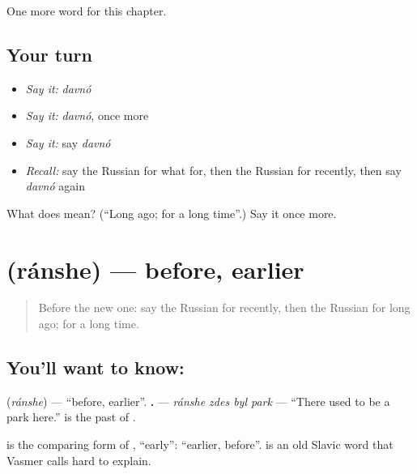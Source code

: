\begin{grammarlens}[title={What you've built}]
One more word for this chapter.
\end{grammarlens}

\subsection*{Your turn}
\begin{itemize}
\raggedright
  \item \emph{Say it:} \emph{davnó}
  \item \emph{Say it:} \emph{davnó}, once more
  \item \emph{Say it:} say \emph{davnó}
  \item \emph{Recall:} say the Russian for what for, then the Russian for recently, then say \emph{davnó} again
\end{itemize}

\begin{tcolorbox}[breakable,colback=teal!4,colframe=teal!35!black,title={Before you move on}]
What does  mean? (\textquotedblleft{}Long ago; for a long time\textquotedblright{}.) Say it once more.
\end{tcolorbox}
\section[\texorpdfstring{\ru{раньше} (ránshe)}{раньше (ránshe)}]{ (ránshe) — before, earlier}

\label{lesson:RU-C137-ranshe}



\begin{quote}
Before the new one: say the Russian for recently, then the Russian for long ago; for a long time.
\end{quote}

\subsection*{You'll want to know: }
\textbf{} (\emph{ránshe}) — \textquotedblleft{}before, earlier\textquotedblright{}. \textbf{   .} — \emph{ránshe zdes byl park} — \textquotedblleft{}There used to be a park here.\textquotedblright{} \textbf{} is the past of \textbf{}.

\begin{cousinweb}
\textbf{} is the comparing form of \emph{}, \textquotedblleft{}early\textquotedblright{}: \textquotedblleft{}earlier, before\textquotedblright{}. \emph{} is an old Slavic word that Vasmer calls hard to explain.
\end{cousinweb}


